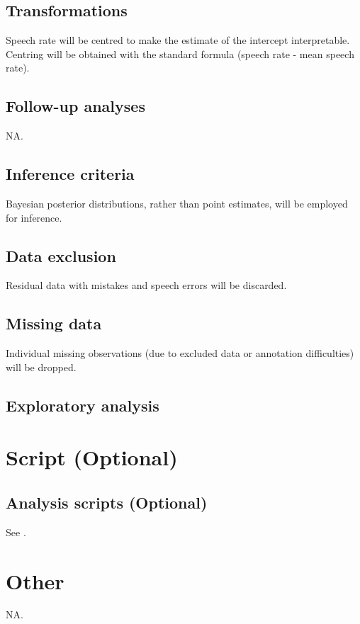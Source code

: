 \documentclass[11pt,]{article}
\begin{document}
\hypertarget{transformations}{%
\subsection{Transformations}\label{transformations}}

Speech rate will be centred to make the estimate of the intercept
interpretable. Centring will be obtained with the standard formula
(speech rate - mean speech rate).

\hypertarget{follow-up-analyses}{%
\subsection{Follow-up analyses}\label{follow-up-analyses}}

NA.

\hypertarget{inference-criteria}{%
\subsection{Inference criteria}\label{inference-criteria}}

Bayesian posterior distributions, rather than point estimates, will be
employed for inference.

\hypertarget{data-exclusion}{%
\subsection{Data exclusion}\label{data-exclusion}}

Residual data with mistakes and speech errors will be discarded.

\hypertarget{missing-data}{%
\subsection{Missing data}\label{missing-data}}

Individual missing observations (due to excluded data or annotation
difficulties) will be dropped.

\hypertarget{exploratory-analysis}{%
\subsection{Exploratory analysis}\label{exploratory-analysis}}

\hypertarget{script-optional}{%
\section{Script (Optional)}\label{script-optional}}

\hypertarget{analysis-scripts-optional}{%
\subsection{Analysis scripts
(Optional)}\label{analysis-scripts-optional}}

See .

\hypertarget{other}{%
\section{Other}\label{other}}

\label{s:other}

NA.


\end{document}
